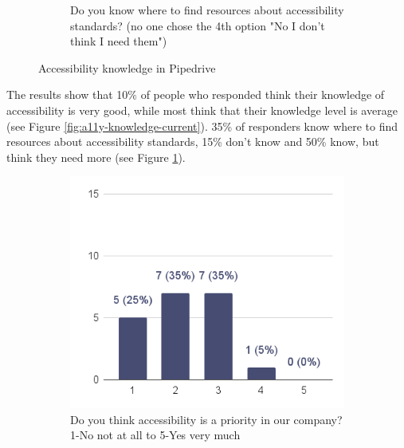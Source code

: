 \documentclass{master_thesis}
\begin{document}
\begin{figure}[H]
\begin{subfigure}{0.4\textwidth}
		\caption{Do you know where to find resources
		about accessibility standards? (no one chose the 4th option "No I don't think I need them") }
    	\label{fig:a11y-resources}
	\end{subfigure}
	\caption{Accessibility knowledge in Pipedrive}
    \label{fig:a11y-knowledge}
\end{figure}

The results show that 10\% of people who responded think their knowledge of accessibility is very good, while most think that their knowledge level is average (see Figure \ref{fig:a11y-knowledge-current}). 35\% of responders know where to find resources about accessibility standards, 15\% don't know and 50\% know, but think they need more (see Figure \ref{fig:a11y-resources}).

\begin{figure}[H]
    \centering
	\begin{subfigure}{0.45\textwidth}
		\includegraphics[width=\textwidth]{img/a11y-priority.png}
		\caption{Do you think accessibility is a priority in our company? 1-No not at all to 5-Yes very much \\
		\\
		\\}
	\end{subfigure}
	\hspace{0.05\textwidth}
	\begin{subfigure}{0.45\textwidth}

\end{subfigure}
\end{figure}
\end{document}
